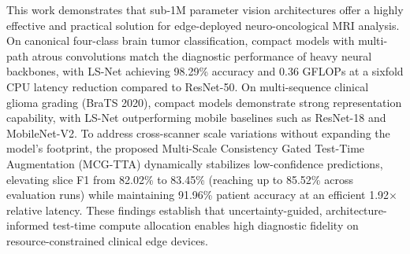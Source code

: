 \documentclass[journal]{IEEEtran}
\begin{document}
This work demonstrates that sub-1M parameter vision architectures offer a highly effective and practical solution for edge-deployed neuro-oncological MRI analysis. On canonical four-class brain tumor classification, compact models with multi-path atrous convolutions match the diagnostic performance of heavy neural backbones, with LS-Net achieving 98.29\% accuracy and 0.36 GFLOPs at a sixfold CPU latency reduction compared to ResNet-50. On multi-sequence clinical glioma grading (BraTS 2020), compact models demonstrate strong representation capability, with LS-Net outperforming mobile baselines such as ResNet-18 and MobileNet-V2. To address cross-scanner scale variations without expanding the model's footprint, the proposed Multi-Scale Consistency Gated Test-Time Augmentation (MCG-TTA) dynamically stabilizes low-confidence predictions, elevating slice F1 from 82.02\% to 83.45\% (reaching up to 85.52\% across evaluation runs) while maintaining 91.96\% patient accuracy at an efficient 1.92$\times$ relative latency. These findings establish that uncertainty-guided, architecture-informed test-time compute allocation enables high diagnostic fidelity on resource-constrained clinical edge devices.

\end{document}

